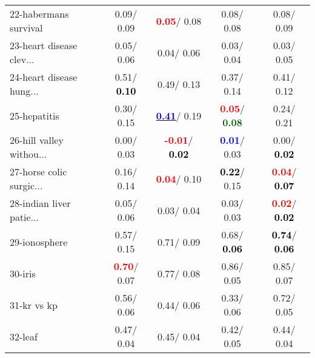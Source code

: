 \begin{table}[h]
\begin{center}
\begin{tabular}{lc|c|c|c}
22-habermans survival &   0.09/  0.09 & \textcolor{red}{\textbf{  0.05}}/  0.08 &   0.08/  0.08 &   0.08/  0.09 \\
23-heart disease clev... &   0.05/  0.06 &   0.04/  0.06 &   0.03/  0.04 &   0.03/  0.05 \\
24-heart disease hung... &   0.51/\textcolor{black}{\textbf{  0.10}} &   0.49/  0.13 &   0.37/  0.14 &   0.41/  0.12 \\
25-hepatitis &   0.30/  0.15 & \underline{\textcolor{blue}{\textbf{  0.41}}}/  0.19 & \textcolor{red}{\textbf{  0.05}}/\textcolor{darkgreen}{\textbf{  0.08}} &   0.24/  0.21 \\
26-hill valley withou... &   0.00/  0.03 & \textcolor{red}{\textbf{ -0.01}}/\textcolor{black}{\textbf{  0.02}} & \textcolor{blue}{\textbf{  0.01}}/  0.03 &   0.00/\textcolor{black}{\textbf{  0.02}} \\
27-horse colic surgic... &   0.16/  0.14 & \textcolor{red}{\textbf{  0.04}}/  0.10 & \textcolor{black}{\textbf{  0.22}}/  0.15 & \textcolor{red}{\textbf{  0.04}}/\textcolor{black}{\textbf{  0.07}} \\
28-indian liver patie... &   0.05/  0.06 &   0.03/  0.04 &   0.03/  0.03 & \textcolor{red}{\textbf{  0.02}}/\textcolor{black}{\textbf{  0.02}} \\ \hline
29-ionosphere &   0.57/  0.15 &   0.71/  0.09 &   0.68/\textcolor{black}{\textbf{  0.06}} & \textcolor{black}{\textbf{  0.74}}/\textcolor{black}{\textbf{  0.06}} \\
30-iris & \textcolor{red}{\textbf{  0.70}}/  0.07 &   0.77/  0.08 &   0.86/  0.05 &   0.85/  0.07 \\
31-kr vs kp &   0.56/  0.06 &   0.44/  0.06 &   0.33/  0.06 &   0.72/  0.05 \\
32-leaf &   0.47/  0.04 &   0.45/  0.04 &   0.42/  0.05 &   0.44/  0.04 \\\end{tabular}\label{stratsALCKappa0bVFDTRedux}
\end{center}
\end{table}
